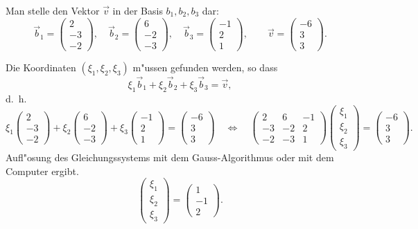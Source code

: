 \begin{beispiel}
Man stelle den Vektor $\vec v$ in der Basis $b_1,b_2,b_3$ dar:
\[
\vec b_1=\begin{pmatrix}2\\-3\\-2\end{pmatrix},\quad
\vec b_2=\begin{pmatrix}6\\-2\\-3\end{pmatrix},\quad
\vec b_3=\begin{pmatrix}-1\\2\\1\end{pmatrix},\qquad
\vec v=\begin{pmatrix}-6\\3\\3\end{pmatrix}.
\]

\smallskip

{\parindent 0pt
Die} Koordinaten $(\xi_1,\xi_2,\xi_3)$ m"ussen gefunden
werden, so dass
\[
\xi_1\vec b_1+
\xi_2\vec b_2+
\xi_3\vec b_3
=
\vec v,
\]
d.~h.
\[
\xi_1\begin{pmatrix}2\\-3\\-2\end{pmatrix}+
\xi_2\begin{pmatrix}6\\-2\\-3\end{pmatrix}+
\xi_3\begin{pmatrix}-1\\2\\1\end{pmatrix}=
\begin{pmatrix}-6\\3\\3\end{pmatrix}
\quad
\Leftrightarrow
\quad
\begin{pmatrix}
2&6&-1\\
-3&-2&2\\
-2&-3&1
\end{pmatrix}
\begin{pmatrix}\xi_1\\\xi_2\\\xi_3\end{pmatrix}
=
\begin{pmatrix}-6\\3\\3\end{pmatrix}.
\]
Aufl"osung des Gleichungssystems mit dem Gauss-Algorithmus oder mit
dem Computer ergibt.
\[
\begin{pmatrix}\xi_1\\\xi_2\\\xi_3\end{pmatrix}
=
\begin{pmatrix}1\\-1\\2 \end{pmatrix}.
\]
\end{beispiel}

